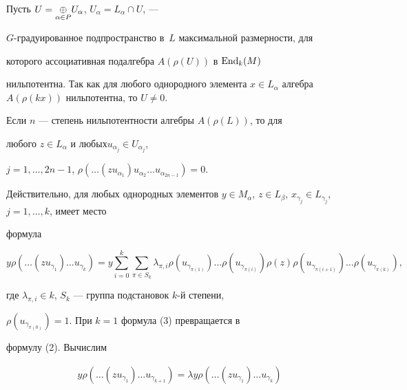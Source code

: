 \begin{pf} 


Пусть $U=\underset{\alpha\in P}{\oplus}{} U_\alpha$, $U_\alpha=L_\alpha\cap U$, ---


$G$-градуированное подпространство в~$L$ максимальной размерности, для 


которого ассоциативная подалгебра $A(\rho(U))$ в $\operatorname{End}_k(M)$ 


нильпотентна. Так как для любого однородного элемента $x\in 


L_\alpha$ алгебра $A(\rho(k x))$ нильпотентна, то $U\ne0$. 


 


Если $n$ --- степень нильпотентности алгебры $A(\rho(L))$, то для 


любого $z\in L_\alpha$ и любых\linebreak $u_{\alpha_j}\in U_{\alpha_j}$, 


$j=1,\dotsc,2n-1$, $\rho(\dotsc(z u_{\alpha_1})u_{\alpha_2}\dotsc 


u_{\alpha_{2n-1}})=0$.  


 


Действительно, для любых однородных элементов $y\in M_\alpha$, $z\in 


L_\beta$, $x_{\gamma_j}\in L_{\gamma_j}$, $j=1,\dotsc,k$, имеет место 


формула 


\begin{equation} 


y\rho(\dotsc(z u_{\gamma_1})\dotsc u_{\gamma_k})=y\sum^k_{i=0} 


\sum_{\pi\in S_k}\lambda_{\pi,i}\rho(u_{\gamma_{\pi(1)}})\dotsc 


\rho(u_{\gamma_{\pi(i)}})\rho(z) 


\rho(u_{\gamma_{\pi(i+1)}})\dotsc \rho(u_{\gamma_{\pi(k)}}), 


\end{equation} 


где $\lambda_{\pi,i}\in k$, $S_k$ --- группа подстановок $k$-й степени, 


$\rho(u_{\gamma_{\pi(0)}})=1$. При $k=1$ формула (3) превращается в 


формулу (2). Вычислим 


\begin{multline*} 


y\rho(\dotsc(z u_{\gamma_1})\dotsc u_{\gamma_{k+1}})= 


\lambda y\rho(\dotsc(z u_{\gamma_1})\dotsc u_{\gamma_k}) 



\end{multline*}
\end{pf}
